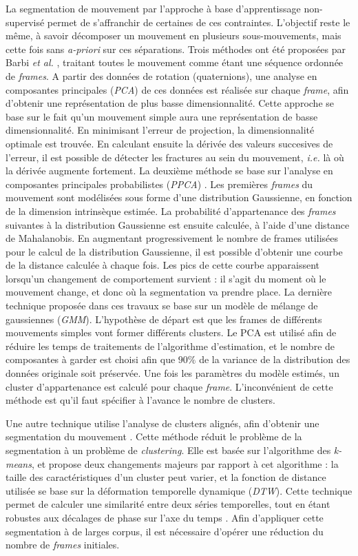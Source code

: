 La segmentation de mouvement par l'approche à base d'apprentissage non-supervisé permet de s'affranchir de certaines de ces contraintes. L'objectif reste le même, à savoir décomposer un mouvement en plusieurs sous-mouvements, mais cette fois sans \textit{a-priori} sur ces séparations. Trois méthodes ont été proposées par Barbi \textit{et al.} \parencite{Barbic2004SMC}, traitant toutes le mouvement comme étant une séquence ordonnée de \textit{frames}. A partir des données de rotation (quaternions), une analyse en composantes principales (\textit{PCA}) de ces données est réalisée sur chaque \textit{frame}, afin d'obtenir une représentation de plus basse dimensionnalité. Cette approche se base sur le fait qu'un mouvement simple aura une représentation de basse dimensionnalité. En minimisant l'erreur de projection, la dimensionnalité optimale est trouvée. En calculant ensuite la dérivée des valeurs succesives de l'erreur, il est possible de détecter les fractures au sein du mouvement, \textit{i.e.} là où la dérivée augmente fortement. La deuxième méthode se base sur l'analyse en composantes principales probabilistes (\textit{PPCA}) \parencite{Tipping1999PPCA}. Les premières \textit{frames} du mouvement sont modélisées sous forme d'une distribution Gaussienne, en fonction de la dimension intrinsèque estimée. La probabilité d'appartenance des \textit{frames} suivantes à la distribution Gaussienne est ensuite calculée, à l'aide d'une distance de Mahalanobis. En augmentant progressivement le nombre de frames utilisées pour le calcul de la distribution Gaussienne, il est possible d'obtenir une courbe de la distance calculée à chaque fois. Les pics de cette courbe apparaissent lorsqu'un changement de comportement survient : il s'agit du moment où le mouvement change, et donc où la segmentation va prendre place. La dernière technique proposée dans ces travaux se base sur un modèle de mélange de gaussiennes (\textit{GMM}). L'hypothèse de départ est que les frames de différents mouvements simples vont former différents clusters. Le PCA est utilisé afin de réduire les temps de traitements de l'algorithme d'estimation, et le nombre de composantes à garder est choisi afin que $90\%$ de la variance de la distribution des données originale soit préservée. Une fois les paramètres du modèle estimés, un cluster d'appartenance est calculé pour chaque \textit{frame}. L'inconvénient de cette méthode est qu'il faut spécifier à l'avance le nombre de clusters.

Une autre technique utilise l'analyse de clusters alignés, afin d'obtenir une segmentation du mouvement \parencite{Zhou2008ACA}. Cette méthode réduit le problème de la segmentation à un problème de \textit{clustering}. Elle est basée sur l'algorithme des \textit{k-means}, et propose deux changements majeurs par rapport à cet algorithme : la taille des caractéristiques d'un cluster peut varier, et la fonction de distance utilisée se base sur la déformation temporelle dynamique (\textit{DTW}). Cette technique permet de calculer une similarité entre deux séries temporelles, tout en étant robustes aux décalages de phase sur l'axe du temps \parencite{Berndt1994DTW}. Afin d'appliquer cette segmentation à de larges corpus, il est nécessaire d'opérer une réduction du nombre de \textit{frames} initiales.

